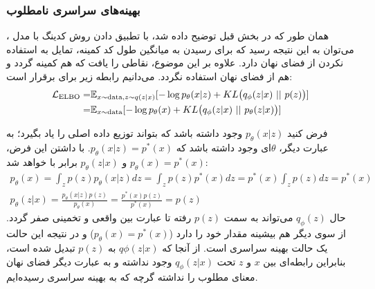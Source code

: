 \subsubsection{بهینه‌های سراسری نامطلوب}
همان ‌طور که در بخش قبل توضیح داده شد، با تطبیق دادن روش کدینگ   با مدل \vae{}، می‌توان به این نتیجه رسید که \decoder{} برای رسیدن به میانگین طول کد کمینه، تمایل به استفاده نکردن از فضای نهان دارد. علاوه بر این موضوع، نقاطی را یافت که هم  کمینه گردد و هم از فضای نهان استفاده نگردد. می‌دانیم رابطه زیر برای  برقرار است:
\begin{align}
	\mathcal{L}_{\text{ELBO}} = & \mathbb E_{x \sim \text{data}, z \sim q(z|x)} [- \log p_\theta(x|z) + KL\big(q_\phi(z|x) ~ || ~ p(z)\big)] \nonumber
	\\
	= & \mathbb E_{x \sim \text{data}} [-\log p_\theta(x) + KL\big(q_\phi(z|x) ~||~ p_\theta(z|x)\big)] \nonumber
\end{align}

فرض کنید $p_\theta(x|z)$ وجود داشته باشد که بتواند توزیع داده اصلی را یاد بگیرد؛ به عبارت دیگر، $\theta$ای وجود داشته باشد که $p_\theta(x|z) = p^*(x)$. با داشتن این فرض، 
$p_\theta(x) = p^*(x)$
و 
$p_\theta(z|x)$
 برابر با \priordist{} خواهد شد:
\begin{gather}
p_\theta(x) = \int_z p(z) p_\theta(x|z) dz = \int_z p(z) p^*(x) dz = p^*(x) \int_z p(z) dz = p^*(x)
\\
p_\theta(z|x) = \frac{p_\theta(x|z) p(z)}{p_\theta(x)} = \frac{p^*(x) p(z)}{p^*(x)} = p(z)
\end{gather}
حال $q_\phi(z)$ می‌تواند به سمت $p(z)$ رفته تا عبارت  بین \posterior{} واقعی و تخمینی صفر گردد. از سوی دیگر هم \likelihood{} بیشینه مقدار خود را دارد ($p_\theta(x) = p^*(x)$) و در نتیجه این حالت یک حالت بهینه سراسری است. از آنجا که $q\phi(z|x)$ به $p(z)$ تبدیل شده است، بنابراین رابطه‌ای بین $x$ و $z$ تحت $q_\phi(z|x)$ وجود نداشته و به عبارت دیگر فضای نهان معنای مطلوب را نداشته گرچه که به بهینه سراسری رسیده‌ایم.

